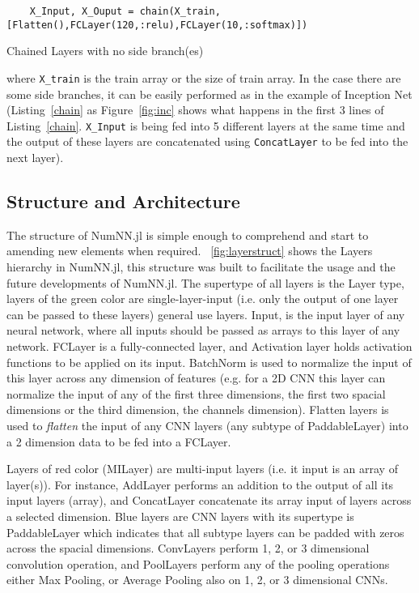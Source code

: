 \begin{listing}[H]
	\begin{verbatim}
	X_Input, X_Ouput = chain(X_train,[Flatten(),FCLayer(120,:relu),FCLayer(10,:softmax)])
	\end{verbatim}
	\caption{Chained Layers with no side branch(es)}\label{chain}
\end{listing}


where \texttt{X_train} is the train array or the size of train array. In the case there are some side branches, it can be easily performed as in the example of Inception Net \cite{Szegedy2016} (Listing~\ref{chain} as Figure~\ref{fig:inc} shows what happens in the first 3 lines of Listing~\ref{chain}. \texttt{X_Input} is being fed into 5 different layers at the same time and the output of these layers are concatenated using \texttt{ConcatLayer} to be fed into the next layer). 


\subsection{Structure and Architecture}\label{subsec:saa}

The structure of NumNN.jl is simple enough to comprehend and start to amending new elements when required. \figurename~\ref{fig:layerstruct} shows the Layers hierarchy in NumNN.jl, this structure was built to facilitate the usage and the future developments of NumNN.jl. The supertype of all layers is the {Layer} type, layers of the green color are single-layer-input (i.e. only the output of one layer can be passed to these layers) general use layers. Input, is the input layer of any neural network, where all inputs should be passed as arrays to this layer of any network. FCLayer is a fully-connected layer, and Activation layer holds activation functions to be applied on its input. BatchNorm is used to normalize the input of this layer across any dimension of features (e.g. for a 2D CNN this layer can normalize the input of any of the first three dimensions, the first two spacial dimensions or the third dimension, the channels dimension). Flatten layers is used to \emph{flatten} the input of any CNN layers (any subtype of PaddableLayer) into a 2 dimension data to be fed into a FCLayer.

Layers of red color (MILayer) are multi-input layers (i.e. it input is an array of layer(s)). For instance, AddLayer performs an addition to the output of all its input layers (array), and ConcatLayer concatenate its array input of layers across a selected dimension. Blue layers are CNN layers with its supertype is PaddableLayer which indicates that all subtype layers can be padded with zeros across the spacial dimensions. ConvLayers perform 1, 2, or 3 dimensional convolution operation, and PoolLayers perform any of the pooling operations either Max Pooling, or Average Pooling also on 1, 2, or 3 dimensional CNNs.

